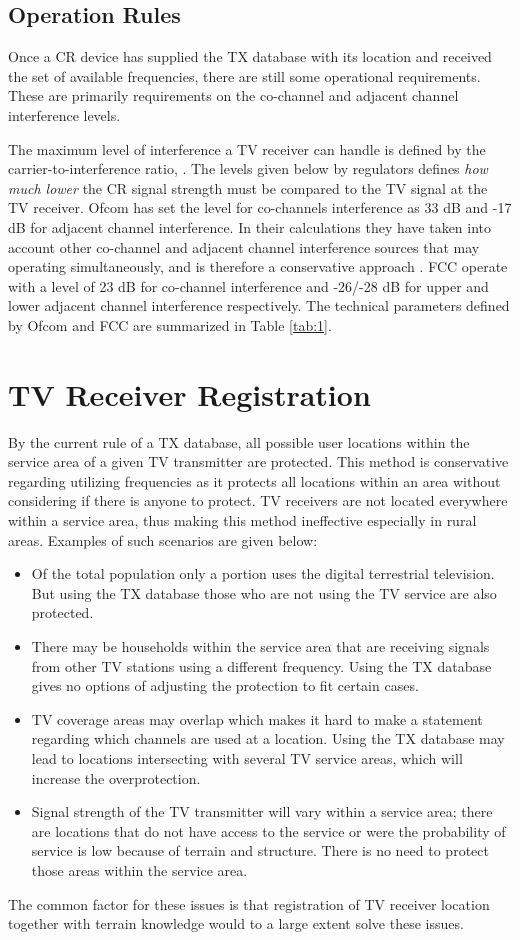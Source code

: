 \documentclass[journal,11pt,draftclsnofoot,onecolumn]{IEEEtran}
\begin{document}
\subsection{Operation Rules}
Once a CR device has supplied the TX database with its location and received the set of available frequencies, there are still some operational requirements. These are primarily requirements on the co-channel and adjacent channel interference levels.

The maximum level of interference a TV receiver can handle is defined by the carrier-to-interference ratio, . The  levels given below by regulators defines \textit{how much lower} the CR signal strength must be compared to the TV signal at the TV receiver. Ofcom has set the  level for co-channels interference as 33 dB and -17 dB for adjacent channel interference. In their calculations they have taken into account other co-channel and adjacent channel interference sources that may operating simultaneously, and is therefore a conservative approach \cite{ofcom_2009}. FCC operate with a  level of 23 dB for co-channel interference and -26/-28 dB for upper and lower adjacent channel interference respectively. The technical parameters defined by Ofcom and FCC are summarized in Table \ref{tab:1}.

\section{TV Receiver Registration}
\label{sec:tvrx-reg}
By the current rule of a TX database, all possible user locations within the service area of a given TV transmitter are protected. This method is conservative regarding utilizing frequencies as it protects all locations within an area without considering if there is anyone to protect. TV receivers are not located everywhere within a service area, thus making this method ineffective especially in rural areas. Examples of such scenarios are given below:
\begin{itemize}
\item Of the total population only a portion uses the digital terrestrial television. But using the TX database those who are not using the TV service are also protected.
\item There may be households within the service area that are receiving signals from other TV stations using a different frequency. Using the TX database gives no options of adjusting the protection to fit certain cases.
\item TV coverage areas may overlap which makes it hard to make a statement regarding which channels are used at a location. Using the TX database may lead to locations intersecting with several TV service areas, which will increase the overprotection. \item Signal strength of the TV transmitter will vary within a service area; there are locations that do not have access to the service or were the probability of service is low because of terrain and structure. There is no need to protect those areas within the service area. 
\end{itemize}
The common factor for these issues is that registration of TV receiver location together with terrain knowledge would to a large extent solve these issues.
\end{document}
